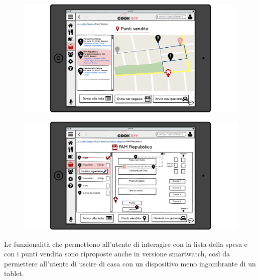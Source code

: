 \begin{figure}[H]
	\centering
	\includegraphics[width=0.95\linewidth]{img/mockup/punti-vendita.png}
\end{figure}
\begin{figure}[H]
	\centering
	\includegraphics[width=0.95\linewidth]{img/mockup/punti-vendita-2.png}
\end{figure}

Le funzionalità che permettono all'utente di interagire con la lista
della spesa e con i punti vendita sono riproposte anche in versione
smartwatch, così da permettere all'utente di uscire di casa con un
dispositivo meno ingombrante di un tablet.

